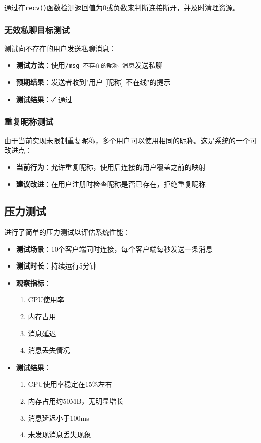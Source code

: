 \documentclass[12pt, a4paper]{article}
\newcommand{\cmd}[1]{\texttt{#1}}
\begin{document}
通过在\cmd{recv()}函数检测返回值为0或负数来判断连接断开，并及时清理资源。

\subsubsection{无效私聊目标测试}

测试向不存在的用户发送私聊消息：

\begin{itemize}[itemsep=3pt]
  \item \textbf{测试方法}：使用\cmd{/msg 不存在的昵称 消息}发送私聊
  \item \textbf{预期结果}：发送者收到"用户 [昵称] 不在线"的提示
  \item \textbf{测试结果}：✓ 通过
\end{itemize}

\subsubsection{重复昵称测试}

由于当前实现未限制重复昵称，多个用户可以使用相同的昵称。这是系统的一个可改进点：

\begin{itemize}[itemsep=3pt]
  \item \textbf{当前行为}：允许重复昵称，使用后连接的用户覆盖之前的映射
  \item \textbf{建议改进}：在用户注册时检查昵称是否已存在，拒绝重复昵称
\end{itemize}

\subsection{压力测试}

进行了简单的压力测试以评估系统性能：

\begin{itemize}[itemsep=3pt]
  \item \textbf{测试场景}：10个客户端同时连接，每个客户端每秒发送一条消息
  \item \textbf{测试时长}：持续运行5分钟
  \item \textbf{观察指标}：
  \begin{enumerate}[itemsep=2pt]
    \item CPU使用率
    \item 内存占用
    \item 消息延迟
    \item 消息丢失情况
  \end{enumerate}
  \item \textbf{测试结果}：
  \begin{enumerate}[itemsep=2pt]
    \item CPU使用率稳定在15\%左右
    \item 内存占用约50MB，无明显增长
    \item 消息延迟小于100ms
    \item 未发现消息丢失现象
  \end{enumerate}
\end{itemize}
\end{document}
